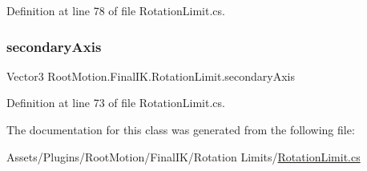 Definition at line 78 of file Rotation\+Limit.\+cs.

\mbox{\label{class_root_motion_1_1_final_i_k_1_1_rotation_limit_adcbc30204a57dd0d982ca186b3ee21ec}} 
\subsubsection{\texorpdfstring{secondary\+Axis}{secondaryAxis}}
{\footnotesize\ttfamily Vector3 Root\+Motion.\+Final\+I\+K.\+Rotation\+Limit.\+secondary\+Axis\hspace{0.3cm}{\ttfamily [get]}}



Definition at line 73 of file Rotation\+Limit.\+cs.



The documentation for this class was generated from the following file\+:\begin{DoxyCompactItemize}
\item 
Assets/\+Plugins/\+Root\+Motion/\+Final\+I\+K/\+Rotation Limits/\mbox{\hyperlink{_rotation_limit_8cs}{Rotation\+Limit.\+cs}}\end{DoxyCompactItemize}
